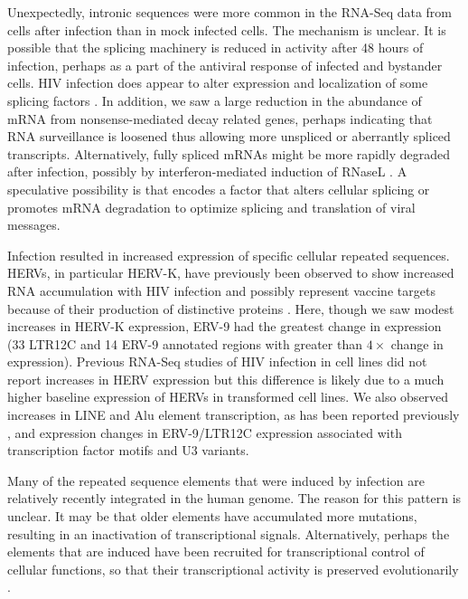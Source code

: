 \documentclass[../sherrill-Mix_thesis.tex]{subfiles}
\begin{document}
	Unexpectedly, intronic sequences were more common in the RNA-Seq data from cells after \hivEight{} infection than in mock infected cells.  The mechanism is unclear.  It is possible that the splicing machinery is reduced in activity after 48 hours of infection, perhaps as a part of the antiviral response of infected and bystander cells.  HIV infection does appear to alter expression and localization of some splicing factors \citep{Dowling2008,Monette2009}. In addition, we saw a large reduction in the abundance of mRNA from nonsense-mediated decay related genes, perhaps indicating that RNA surveillance is loosened thus allowing more unspliced or aberrantly spliced transcripts.  Alternatively, fully spliced mRNAs might be more rapidly degraded after infection, possibly by interferon-mediated induction of RNaseL \citep{Al-Ahmadi2009}.  A speculative possibility is that \hivEight{} encodes a factor that alters cellular splicing or promotes mRNA degradation to optimize splicing and translation of viral messages.

	Infection resulted in increased expression of specific cellular repeated se\-quences. HERVs, in particular HERV-K, have previously been observed to show increased RNA accumulation with HIV infection \citep{Contreras-Galindo2007,Jones2012,Contreras-Galindo2013,Bhardwaj2014} and possibly represent vaccine targets because of their production of distinctive proteins \citep{Boller1997,Buescher2005,Garrison2007,Tandon2011,SenGupta2011,Jones2012}.  Here, though we saw modest increases in HERV-K expression, ERV-9 had the greatest change in expression (33 LTR12C and 14 ERV-9 annotated regions with greater than $4\times$ change in expression). Previous RNA-Seq studies of HIV infection in cell lines did not report increases in HERV expression \citep{Chang2011,Lefebvre2011} but this difference is likely due to a much higher baseline expression of HERVs in transformed cell lines. We also observed increases in LINE and Alu element transcription, as has been reported previously \citep{Jones2013}, and expression changes in ERV-9/LTR12C expression associated with transcription factor motifs and U3 variants.

	Many of the repeated sequence elements that were induced by \hivEight{} infection are relatively recently integrated in the human genome.  The reason for this pattern is unclear.  It may be that older elements have accumulated more mutations, resulting in an inactivation of transcriptional signals.  Alternatively, perhaps the elements that are induced have been recruited for transcriptional control of cellular functions, so that their transcriptional activity is preserved evolutionarily  \citep{Ling2002,Pi2004,Zhang2006}.
\end{document}
